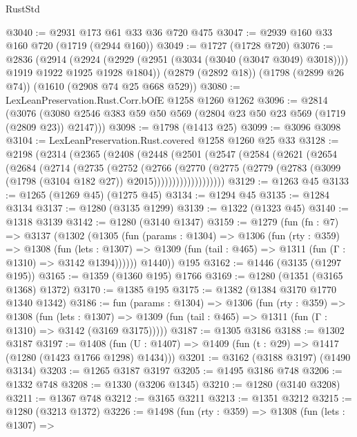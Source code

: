 \begin{lexlean}{RustStd}
\begin{coremodule}
{\begin{coremodule}
{{{{{{{{{{{{@3040 := @2931 @173 @61 @33 @36 @720 @475
@3047 := @2939 @160 @33 @160 @720 (@1719 (@2944 @160))
@3049 := @1727 (@1728 @720)
@3076 := @2836
    (@2914
      (@2924 (@2929 (@2951 (@3034 (@3040 (@3047 @3049) @3018)))) @1919 @1922 @1925 @1928 @1804))
    (@2879 (@2892 @18))
    (@1798 (@2899 @26 @74))
    (@1610 (@2908 @74 @25 @668 @529))
@3080 := LexLeanPreservation.Rust.Corr.bOfE @1258 @1260 @1262
@3096 := @2814
    (@3076 (@3080 @2546 @383 @59 @50 @569 (@2804 @23 @50 @23 @569 (@1719 (@2809 @23)) @2147)))
@3098 := @1798 (@1413 @25)
@3099 := @3096 @3098
@3104 := LexLeanPreservation.Rust.covered @1258 @1260 @25 @33
@3128 := @2198
    (@2314
      (@2365
        (@2408
          (@2448
            (@2501
              (@2547
                (@2584
                  (@2621
                    (@2654
                      (@2684
                        (@2714
                          (@2735
                            (@2752
                              (@2766
                                (@2770
                                  (@2775
                                    (@2779
                                      (@2783
                                        (@3099 (@1798 (@3104 @182 @27)) @2015)))))))))))))))))))
@3129 := @1263 @45
@3133 := @1265 (@1269 @45) (@1275 @45)
@3134 := @1294 @45
@3135 := @1284 @3134
@3137 := @1280 (@3135 @1299)
@3139 := @1322 (@1323 @45)
@3140 := @1318 @3139
@3142 := @1280 (@3140 @1347)
@3159 := @1279
    (fun (fn : @7) =>
    @3137
      (@1302
        (@1305
          (fun (params : @1304) =>
          @1306
            (fun (rty : @359) =>
            @1308
              (fun (lets : @1307) =>
              @1309 (fun (tail : @465) => @1311 (fun (Γ : @1310) => @3142 @1394))))))
        @1440))
    @195
@3162 := @1446 (@3135 (@1297 @195))
@3165 := @1359 (@1360 @195) @1766
@3169 := @1280 (@1351 (@3165 @1368) @1372)
@3170 := @1385 @195
@3175 := @1382 (@1384 @3170 @1770 @1340 @1342)
@3186 := fun (params : @1304) =>
  @1306
    (fun (rty : @359) =>
    @1308
      (fun (lets : @1307) =>
      @1309 (fun (tail : @465) => @1311 (fun (Γ : @1310) => @3142 (@3169 @3175)))))
@3187 := @1305 @3186
@3188 := @1302 @3187
@3197 := @1408 (fun (U : @1407) => @1409 (fun (t : @29) => @1417 (@1280 (@1423 @1766 @1298) @1434)))
@3201 := @3162 (@3188 @3197) (@1490 @3134)
@3203 := @1265 @3187 @3197
@3205 := @1495 @3186 @748
@3206 := @1332 @748
@3208 := @1330 (@3206 @1345)
@3210 := @1280 (@3140 @3208)
@3211 := @1367 @748
@3212 := @3165 @3211
@3213 := @1351 @3212
@3215 := @1280 (@3213 @1372)
@3226 := @1498
    (fun (rty : @359) =>
    @1308
      (fun (lets : @1307) =>
}}}}}}}}}}}}
\end{coremodule}}
\end{coremodule}
\end{lexlean}
